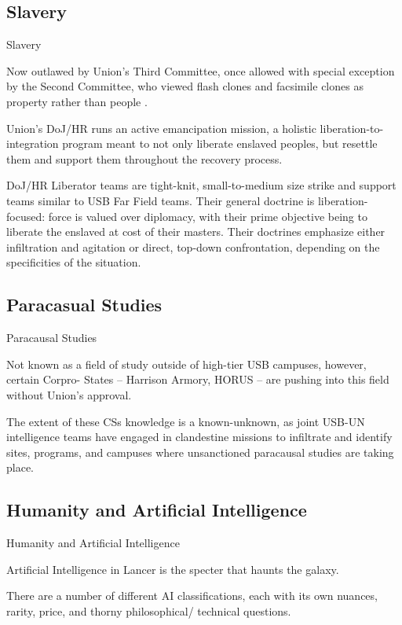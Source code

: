 \subsection{Slavery}
Slavery

Now outlawed by Union’s Third Committee, once allowed with special exception by the Second
Committee, who viewed flash clones and facsimile clones as property rather than people .


Union’s DoJ/HR runs an active emancipation mission, a holistic liberation-to-integration program
meant to not only liberate enslaved peoples, but resettle them and support them throughout the
recovery process.


DoJ/HR Liberator teams are tight-knit, small-to-medium size strike and support teams similar to
USB Far Field teams. Their general doctrine is liberation-focused: force is valued over diplomacy,
with their prime objective being to liberate the enslaved at cost of their masters. Their doctrines
emphasize either infiltration and agitation or direct, top-down confrontation, depending on the
specificities of the situation.

\subsection{Paracasual Studies}
Paracausal Studies

Not known as a field of study outside of high-tier USB campuses, however, certain Corpro-
States -- Harrison Armory, HORUS -- are pushing into this field without Union’s approval.





The extent of these CSs knowledge is a known-unknown, as joint USB-UN intelligence teams
have engaged in clandestine missions to infiltrate and identify sites, programs, and campuses
where unsanctioned paracausal studies are taking place.

\subsection{Humanity and Artificial Intelligence}

Humanity and Artificial Intelligence

Artificial Intelligence in Lancer is the specter that haunts the galaxy.


There are a number of different AI classifications, each with its own nuances, rarity, price, and
thorny philosophical/ technical questions.


